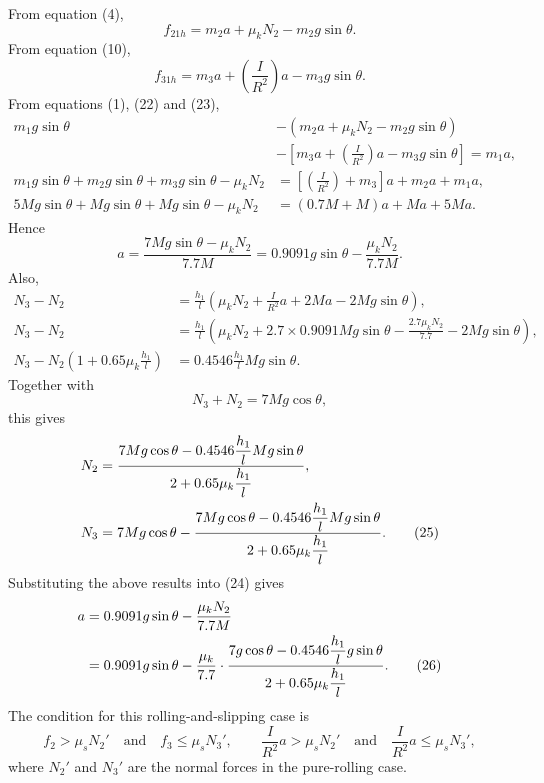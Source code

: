 From equation (4),
\begin{equation}
f_{21h}=m_2a+\mu_kN_2-m_2g\sin\theta. \tag{22}
\end{equation}
From equation (10),
\begin{equation}
f_{31h}=m_3a+\left(\frac{I}{R^2}\right)a-m_3g\sin\theta. \tag{23}
\end{equation}
From equations (1), (22) and (23),
\begin{align*}
m_1g\sin\theta&-(m_2a+\mu_kN_2-m_2g\sin\theta)\\
&-\left[m_3a+\left(\frac{I}{R^2}\right)a-m_3g\sin\theta\right]=m_1a,\\
m_1g\sin\theta+m_2g\sin\theta+m_3g\sin\theta-\mu_kN_2
&=\left[\left(\frac{I}{R^2}\right)+m_3\right]a+m_2a+m_1a,\\
5Mg\sin\theta+Mg\sin\theta+Mg\sin\theta-\mu_kN_2
&=(0.7M+M)a+Ma+5Ma.
\end{align*}
Hence
\begin{equation}
a=\frac{7Mg\sin\theta-\mu_kN_2}{7.7M}
=0.9091g\sin\theta-\frac{\mu_kN_2}{7.7M}. \tag{24}
\end{equation}
Also,
\begin{align*}
N_3-N_2&=\frac{h_1}{l}\left(\mu_kN_2+\frac{I}{R^2}a+2Ma-2Mg\sin\theta\right),\\
N_3-N_2&=\frac{h_1}{l}\left(\mu_kN_2+2.7\times0.9091Mg\sin\theta-\frac{2.7\mu_kN_2}{7.7}-2Mg\sin\theta\right),\\
N_3-N_2\left(1+0.65\mu_k\frac{h_1}{l}\right)&=0.4546\frac{h_1}{l}Mg\sin\theta.
\end{align*}
Together with
\[
N_3+N_2=7Mg\cos\theta,
\]
this gives
\begin{align}
N_2&=\frac{7Mg\cos\theta-0.4546\dfrac{h_1}{l}Mg\sin\theta}{2+0.65\mu_k\dfrac{h_1}{l}},\notag\\
N_3&=7Mg\cos\theta-\frac{7Mg\cos\theta-0.4546\dfrac{h_1}{l}Mg\sin\theta}{2+0.65\mu_k\dfrac{h_1}{l}}. \tag{25}
\end{align}
Substituting the above results into (24) gives
\begin{align}
a&=0.9091g\sin\theta-\frac{\mu_kN_2}{7.7M}\notag\\
&=0.9091g\sin\theta-\frac{\mu_k}{7.7}\cdot
\frac{7g\cos\theta-0.4546\dfrac{h_1}{l}g\sin\theta}{2+0.65\mu_k\dfrac{h_1}{l}}. \tag{26}
\end{align}
The condition for this rolling-and-slipping case is
\begin{equation}
f_2>\mu_sN_2'\quad\text{and}\quad f_3\le\mu_sN_3',
\qquad
\frac{I}{R^2}a>\mu_sN_2'\quad\text{and}\quad\frac{I}{R^2}a\le\mu_sN_3', \tag{27}
\end{equation}
where $N_2'$ and $N_3'$ are the normal forces in the pure-rolling case.

